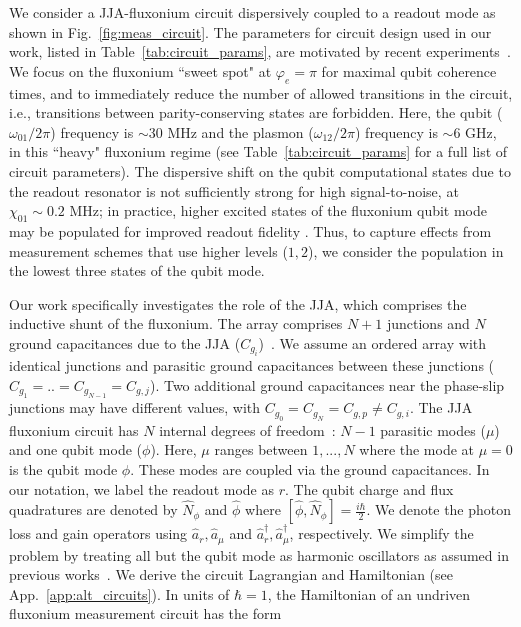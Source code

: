\documentclass[%
reprint,
superscriptaddress,
 amsmath,amssymb,
 aps,
 prx,
longbibliography,
floatfix,
]{revtex4-2}
\begin{document}
We consider a JJA-fluxonium circuit dispersively coupled to a readout mode as shown in Fig.~\ref{fig:meas_circuit}. The parameters for circuit design used in our work, listed in Table~\ref{tab:circuit_params}, are motivated by recent experiments~\cite{zhang_tunable_2024,zhang_universal_2021}. We focus on the fluxonium ``sweet spot" at $\varphi_e = \pi$ for maximal qubit coherence times, and to immediately reduce the number of allowed transitions in the circuit, i.e., transitions between parity-conserving states are forbidden. Here, the qubit ($\omega_{01}/2\pi$) frequency is $\sim 30$ MHz and the plasmon ($\omega_{12}/2\pi$) frequency is $\sim 6$ GHz, in this ``heavy" fluxonium regime (see Table~\ref{tab:circuit_params} for a full list of circuit parameters). The dispersive shift on the qubit computational states due to the readout resonator is not sufficiently strong for high signal-to-noise, at $\chi_{01} \sim 0.2$ MHz; in practice, higher excited states of the fluxonium qubit mode may be populated for improved readout fidelity \cite{zhang_universal_2021}. Thus, to capture effects from measurement schemes that use higher levels ($1,2$), we consider the population in the lowest three states of the qubit mode. 

Our work specifically investigates the role of the JJA, which comprises the inductive shunt of the fluxonium. The array comprises $N+1$ junctions and $N$ ground capacitances due to the JJA ($C_{g_i}$)~\cite{manucharyan2009fluxonium}. We assume an ordered array with identical junctions and parasitic ground capacitances between these junctions ($C_{g_1}=..=C_{g_{N-1}}=C_{g,j}$). Two additional ground capacitances near the phase-slip junctions may have different values, with $C_{g_0}=C_{g_N}=C_{g,p}\neq C_{g, i}$. The JJA fluxonium circuit has $N$ internal degrees of freedom~\cite{ferguson2013symmetries,viola2015collective}: $N-1$ parasitic modes ($\mu$) and one qubit mode ($\phi$). Here, $\mu$ ranges between $1,...,N$ where the mode at $\mu = 0$ is the qubit mode $\phi$. These  modes are coupled via the ground capacitances. 
In our notation, we label the readout mode as $r$. The qubit charge and flux quadratures are denoted by $\hat N_\phi$ and $\hat \phi$ where $[\hat \phi,\hat N_\phi]=\frac{i\hbar}{2}$. We denote the photon loss and gain operators using $\hat a_r,\hat a_\mu$ and $\hat a_r^\dagger,\hat a_\mu^\dagger$, respectively. We simplify the problem by treating all but the qubit mode as harmonic oscillators as assumed in previous works~\cite{ferguson2013symmetries,viola2015collective,dumas2024unified}. We derive the circuit Lagrangian and Hamiltonian (see App.~\ref{app:alt_circuits}). In units of $\hbar=1$, the Hamiltonian of an undriven fluxonium measurement circuit has the form 
\end{document}
